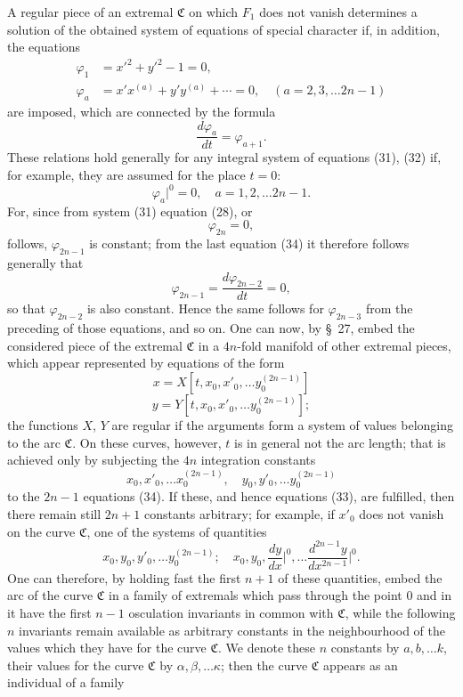 \documentclass[11pt,a4paper,leqno]{article}
\begin{document}
A regular piece of an extremal $\mathfrak C$ on which $F_1$ does not vanish determines a solution of the obtained system of equations of special character if, in addition, the equations
\begin{equation}\tag{33}
\begin{aligned}
\varphi_1&=x'^2+y'^2-1=0,\\
\varphi_a&=x'x^{(a)}+y'y^{(a)}+\cdots=0,\quad (a=2,3,\ldots 2n-1)
\end{aligned}
\end{equation}
are imposed, which are connected by the formula
\[
\frac{d\varphi_a}{dt}=\varphi_{a+1}.
\]
These relations hold generally for any integral system of equations (31), (32) if, for example, they are assumed for the place $t=0$:
\begin{equation}\tag{34}
\varphi_a\bigg|^0=0,
\quad a=1,2,\ldots 2n-1.
\end{equation}
For, since from system (31) equation (28), or
\[
\varphi_{2n}=0,
\]
follows, $\varphi_{2n-1}$ is constant; from the last equation (34) it therefore follows generally that
\[
\varphi_{2n-1}=\frac{d\varphi_{2n-2}}{dt}=0,
\]
so that $\varphi_{2n-2}$ is also constant. Hence the same follows for $\varphi_{2n-3}$ from the preceding of those equations, and so on. One can now, by \S~27, embed the considered piece of the extremal $\mathfrak C$ in a $4n$-fold manifold of other extremal pieces, which appear represented by equations of the form
\[
x=X[t,x_0,x'_0,\ldots y_0^{(2n-1)}]
\]
\[
y=Y[t,x_0,x'_0,\ldots y_0^{(2n-1)}];
\]
the functions $X$, $Y$ are regular if the arguments form a system of values belonging to the arc $\mathfrak C$. On these curves, however, $t$ is in general not the arc length; that is achieved only by subjecting the $4n$ integration constants
\[
x_0,x'_0,\ldots x_0^{(2n-1)},\quad y_0,y'_0,\ldots y_0^{(2n-1)}
\]
to the $2n-1$ equations (34). If these, and hence equations (33), are fulfilled, then there remain still $2n+1$ constants
arbitrary; for example, if $x'_0$ does not vanish on the curve $\mathfrak C$, one of the systems of quantities
\[
x_0,y_0,y'_0,\ldots y_0^{(2n-1)};\quad
x_0,y_0,\frac{dy}{dx}\bigg|^0,
\ldots \frac{d^{2n-1}y}{dx^{2n-1}}\bigg|^0.
\]
One can therefore, by holding fast the first $n+1$ of these quantities, embed the arc of the curve $\mathfrak C$ in a family of extremals which pass through the point 0 and in it have the first $n-1$ osculation invariants in common with $\mathfrak C$, while the following $n$ invariants remain available as arbitrary constants in the neighbourhood of the values which they have for the curve $\mathfrak C$. We denote these $n$ constants by $a,b,\ldots k$, their values for the curve $\mathfrak C$ by $\alpha,\beta,\ldots\kappa$; then the curve $\mathfrak C$ appears as an individual of a family
\end{document}
